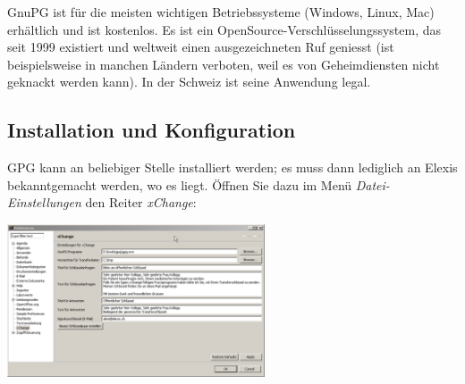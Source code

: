  GnuPG ist für die meisten wichtigen Betriebssysteme (Windows, Linux, Mac) erhältlich und ist kostenlos. Es ist ein OpenSource-Verschlüsselungssystem, das seit 1999 existiert und weltweit einen ausgezeichneten Ruf geniesst (ist beispielsweise in manchen Ländern verboten, weil es von Geheimdiensten nicht geknackt werden kann). In der Schweiz ist seine Anwendung legal.

\subsection{Installation und Konfiguration}

GPG kann an beliebiger Stelle installiert werden; es muss dann lediglich an Elexis bekanntgemacht werden, wo es liegt. Öffnen Sie dazu im Menü \textit{Datei-Einstellungen} den Reiter \textit{xChange}:

\includegraphics[width=3in]{images/xc1.png}

